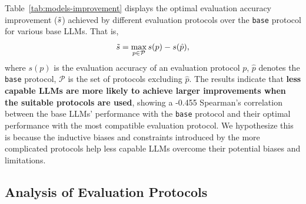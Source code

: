 \documentclass[11pt]{article}
\begin{document}
Table~\ref{tab:models-improvement} displays the optimal evaluation accuracy improvement ($\Tilde{s}$) achieved by different evaluation protocols over the \texttt{base} protocol for various base LLMs.
That is,
\begin{equation}
\label{eq:improvement}
    \Tilde{s} = \max_{p \in \mathcal{P}} s(p) - s(\hat{p}),
\end{equation}
where $s(p)$ is the evaluation accuracy of an evaluation protocol $p$, $\hat{p}$ denotes the \texttt{base} protocol, $\mathcal{P}$ is the set of protocols excluding $\hat{p}$.
The results indicate that \textbf{less capable LLMs are more likely to achieve larger improvements when the suitable protocols are used}, showing a -0.455 Spearman's correlation between the base LLMs' performance with the \texttt{base} protocol and their optimal performance with the most compatible evaluation protocol.
We hypothesize this is because the inductive biases and constraints introduced by the more complicated protocols help less capable LLMs overcome their potential biases and limitations. 
% 




\subsection{Analysis of Evaluation Protocols}
\label{subsec:analysis-protocols}
\end{document}
